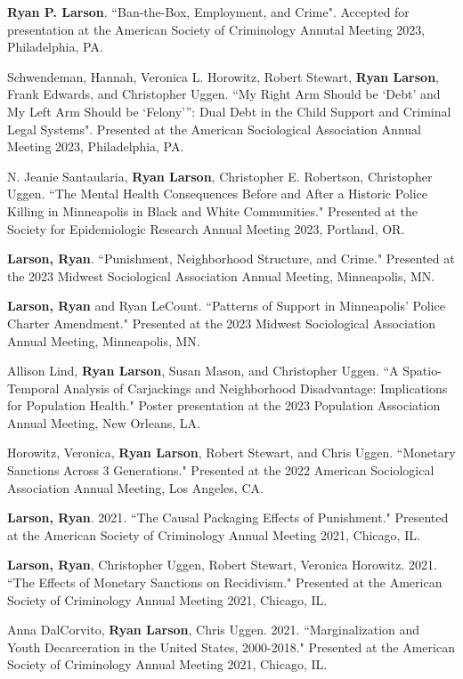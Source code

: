 \documentclass[letterpaper]{article}
\renewenvironment{itemize}{
  \begin{list}{}{
    \setlength{\leftmargin}{1.5em}
  }
}{
  \end{list}
}
\begin{document}
\begin{itemize}
\item \textbf{Ryan P. Larson}. ``Ban-the-Box, Employment, and Crime". Accepted for presentation at the American Society of Criminology Annutal Meeting 2023, Philadelphia, PA. 
\item Schwendeman, Hannah, Veronica L. Horowitz, Robert Stewart, \textbf{Ryan Larson}, Frank Edwards, and Christopher Uggen. ``My Right Arm Should be ‘Debt’ and My Left Arm Should be ‘Felony’”:
Dual Debt in the Child Support and Criminal Legal Systems". Presented at the American Sociological Association Annual Meeting 2023, Philadelphia, PA. 
\item N. Jeanie Santaularia, \textbf{Ryan Larson}, Christopher E. Robertson, Christopher Uggen. ``The Mental Health Consequences Before and After a Historic Police Killing in Minneapolis in Black and White Communities." Presented at the Society for Epidemiologic Research Annual Meeting 2023, Portland, OR.
\item \textbf{Larson, Ryan}.  ``Punishment, Neighborhood Structure, and Crime." Presented at the 2023 Midwest Sociological Association Annual Meeting, Minneapolis, MN. 
\item \textbf{Larson, Ryan} and Ryan LeCount.  ``Patterns of Support in Minneapolis’ Police Charter Amendment." Presented at the 2023 Midwest Sociological Association Annual Meeting, Minneapolis, MN. 
\item Allison Lind, \textbf{Ryan Larson}, Susan Mason, and Christopher Uggen. ``A Spatio-Temporal Analysis of Carjackings and Neighborhood Disadvantage: Implications for Population Health." Poster presentation at the 2023 Population Association Annual Meeting, New Orleans, LA. 
\item Horowitz, Veronica, \textbf{Ryan Larson}, Robert Stewart, and Chris Uggen.  ``Monetary Sanctions Across 3 Generations." Presented at the 2022 American Sociological Association Annual Meeting, Los Angeles, CA. 
\item \textbf{Larson, Ryan}. 2021. ``The Causal Packaging Effects of Punishment." Presented at the American Society of Criminology Annual Meeting 2021, Chicago, IL. 
\item \textbf{Larson, Ryan}, Christopher Uggen, Robert Stewart, Veronica Horowitz. 2021. ``The Effects of Monetary Sanctions on Recidivism." Presented at the American Society of Criminology Annual Meeting 2021, Chicago, IL. 
\item Anna DalCorvito, \textbf{Ryan Larson}, Chris Uggen. 2021. ``Marginalization and Youth Decarceration in the United States, 2000-2018." Presented at the American Society of Criminology Annual Meeting 2021, Chicago, IL. 

\end{itemize}
\end{document}
